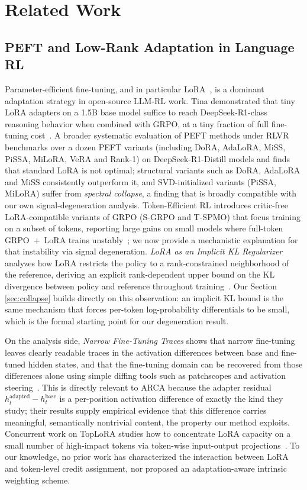 \section{Related Work}\label{sec:related-work}

\subsection{PEFT and Low-Rank Adaptation in Language RL}\label{sec:rw-peft}

Parameter-efficient fine-tuning, and in particular LoRA~\cite{hu2021lora}, is a
dominant adaptation strategy in open-source LLM-RL work. Tina
demonstrated that tiny LoRA adapters on a 1.5B base model suffice to reach
DeepSeek-R1-class reasoning behavior when combined with GRPO, at a tiny fraction of
full fine-tuning cost~\cite{wang2025tina}. A broader systematic evaluation of PEFT
methods under RLVR~\cite{yin2025peftrlvr} benchmarks over a dozen PEFT variants
(including DoRA, AdaLoRA, MiSS, PiSSA, MiLoRA, VeRA and Rank-1) on DeepSeek-R1-Distill
models and finds that standard LoRA is not optimal; structural variants such as DoRA,
AdaLoRA and MiSS consistently outperform it, and SVD-initialized variants (PiSSA,
MiLoRA) suffer from \emph{spectral collapse}, a finding that is broadly compatible with
our own signal-degeneration analysis. Token-Efficient RL introduces critic-free LoRA-compatible
variants of GRPO (S-GRPO and T-SPMO) that focus training on a subset of tokens,
reporting large gains on small models where full-token GRPO~+~LoRA trains
unstably~\cite{lee2025tokenefficientrl}; we now provide a mechanistic explanation for
that instability via signal degeneration. \emph{LoRA as an Implicit KL Regularizer}
analyzes how LoRA restricts the policy to a rank-constrained neighborhood of the
reference, deriving an explicit rank-dependent upper bound on the KL divergence between
policy and reference throughout training~\cite{anon2026implicitklra}. Our Section
\ref{sec:collapse} builds directly on this observation: an implicit KL bound is the
same mechanism that forces per-token log-probability differentials to be small,
which is the formal starting point for our degeneration result.

On the analysis side, \emph{Narrow Fine-Tuning Traces} shows that narrow
fine-tuning leaves clearly readable traces in the activation differences between
base and fine-tuned hidden states, and that the fine-tuning domain can be
recovered from those differences alone using simple diffing tools such as
patchscopes and activation steering~\cite{minder2025narrowfinetuning}. This is
directly relevant to ARCA because the adapter residual
$h^{\mathrm{adapted}}_t - h^{\mathrm{base}}_t$ is a per-position activation
difference of exactly the kind they study; their results supply empirical
evidence that this difference carries meaningful, semantically nontrivial
content, the property our method exploits. Concurrent work on
TopLoRA studies how to concentrate LoRA capacity on a small number of
high-impact tokens via token-wise input-output projections~\cite{li2025toplora}. To our knowledge, no prior work has characterized the
interaction between LoRA and token-level credit assignment, nor proposed an
adaptation-aware intrinsic weighting scheme.

